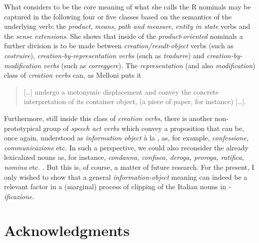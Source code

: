 \documentclass[output=paper]{langsci/langscibook}
\begin{document}
What
%
\citet[108]{Melloni2011} %
%
considers to be the core meaning of what she calls the R
nominals  may be captured in the following four or five classes
based on the semantics of the underlying verb: the \emph{product},
\emph{means}, \emph{path and measure}, \emph{entity in state} verbs and
the \emph{sense extensions}. She shows that inside of the
\emph{product}-\emph{oriented} nominals a further division is to be made
between \emph{creation/result-object} verbs (such as \emph{costruire}),
\emph{creation-by-representation verbs} (such as \emph{tradurre}) and
\emph{creation-by-modification verbs} (such as \emph{correggere}). The
\emph{representation} (and also \emph{modification}) class of
\emph{creation verbs} can, as %
Melloni puts it

\begin{quote}

[\ldots]  undergo a metonymic displacement and convey the concrete
interpretation of its container object, (a piece of paper, for instance)
[\ldots]. \citep[201]{Melloni2011}
\end{quote}

Furthermore, still inside this class of \emph{creation verbs}, there is
another non-proto\-typical group of \emph{speech act verbs} %
\citep[see][213--214]{Melloni2011} %
%
 which convey a proposition that can be, once again,
understood as \emph{information object} à la %
\citet{pustejovsky91}%
%
, as, for
example, \emph{confessione, communicazione} etc. In such a perspective,
we could also reconsider the already lexicalized nouns as, for instance,
\emph{condanna, confisca, deroga, proroga, ratifica, nomina} etc. %
\citep[see][519]{Thornton2004}%
%
. But this is, of course, a matter of future
research. For the present, I only wished to show that a general
\emph{information-object} meaning can indeed be a relevant factor in a
(marginal) process of clipping of the Italian nouns in
\emph{-ificazione}.

\section*{Acknowledgments}
\end{document}
